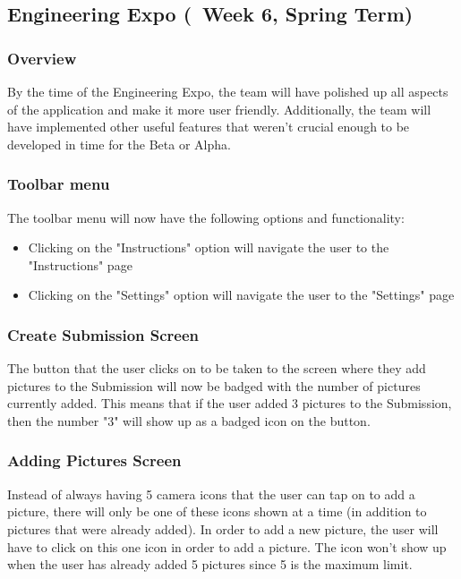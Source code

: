 \documentclass[onecolumn, draftclsnofoot, article, 10pt, compsoc]{IEEEtran}
\begin{document}
\subsection{Engineering Expo (~Week 6, Spring Term)}
\subsubsection{Overview}
By the time of the Engineering Expo, the team will have polished up all aspects of the application and make it more user friendly. Additionally, the team will have implemented other useful features that weren't crucial enough to be developed in time for the Beta or Alpha.

\subsubsection{Toolbar menu}
The toolbar menu will now have the following options and functionality:
\begin{itemize}
\item Clicking on the "Instructions" option will navigate the user to the "Instructions" page
\item Clicking on the "Settings" option will navigate the user to the "Settings" page
\end{itemize}



\subsubsection{Create Submission Screen}
The button that the user clicks on to be taken to the screen where they add pictures to the Submission will now be badged with the number of pictures currently added. This means that if the user added 3 pictures to the Submission, then the number "3" will show up as a badged icon on the button.

\subsubsection{Adding Pictures Screen}
Instead of always having 5 camera icons that the user can tap on to add a picture, there  will only be one of these icons shown at a time (in addition to pictures that were already added). In order to add a new picture, the user will have to click on this one icon in order to add a picture. The icon won't show up when the user has already added 5 pictures since 5 is the maximum limit.
\end{document}
